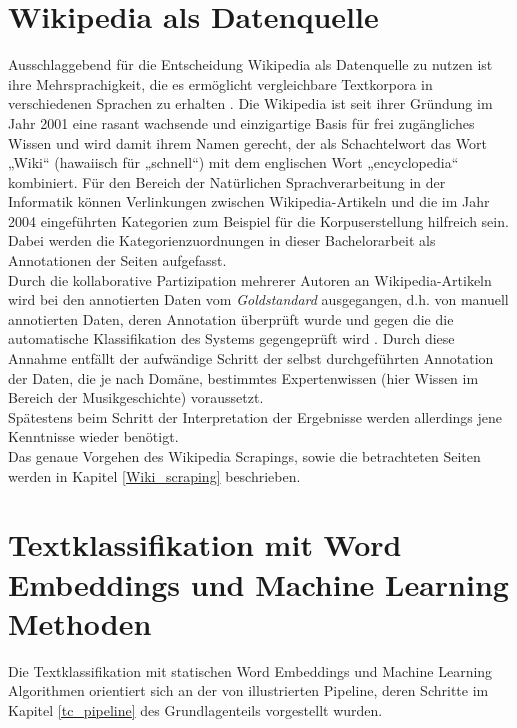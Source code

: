 \documentclass[ngerman]{ttlab-qualify}
\begin{document}
\section{Wikipedia als Datenquelle}
Ausschlaggebend für die Entscheidung Wikipedia als Datenquelle zu nutzen ist ihre Mehrsprachigkeit, die es ermöglicht vergleichbare Textkorpora in verschiedenen Sprachen zu erhalten \parencite{wiki_multilingual}. Die Wikipedia ist seit ihrer Gründung im Jahr 2001 eine rasant wachsende und einzigartige Basis für frei zugängliches Wissen und wird damit ihrem Namen gerecht, der als Schachtelwort das Wort „Wiki“ (hawaiisch für „schnell“) mit dem englischen Wort „encyclopedia“ \parencite{wiki:Wikipedia} kombiniert.
Für den Bereich der Natürlichen Sprachverarbeitung in der Informatik können Verlinkungen zwischen Wikipedia-Artikeln und die im Jahr 2004 eingeführten Kategorien zum Beispiel für die Korpuserstellung hilfreich sein. \\
Dabei werden die Kategorienzuordnungen in dieser Bachelorarbeit als Annotationen der Seiten aufgefasst.\\ 
Durch die kollaborative Partizipation mehrerer Autoren an Wikipedia-Artikeln wird bei den annotierten Daten vom \textit{Goldstandard} ausgegangen, d.h. von manuell annotierten Daten, deren Annotation überprüft wurde und gegen die die automatische Klassifikation des Systems gegengeprüft wird \parencite{bird2009natural}. Durch diese Annahme entfällt der aufwändige Schritt der selbst durchgeführten Annotation der Daten, die je nach Domäne, bestimmtes Expertenwissen (hier Wissen im Bereich der Musikgeschichte) voraussetzt.\\ 
Spätestens beim Schritt der Interpretation der Ergebnisse werden allerdings jene Kenntnisse wieder benötigt.\\
Das genaue Vorgehen des Wikipedia Scrapings, sowie die betrachteten Seiten werden in Kapitel \ref{Wiki_scraping} beschrieben.

\section{Textklassifikation mit Word Embeddings und Machine Learning Methoden}
Die Textklassifikation mit statischen Word Embeddings und Machine Learning Algorithmen orientiert sich an der von \textcite{Kowsari_2019} illustrierten Pipeline, deren Schritte im Kapitel \ref{tc_pipeline} des Grundlagenteils vorgestellt wurden.
\end{document}
